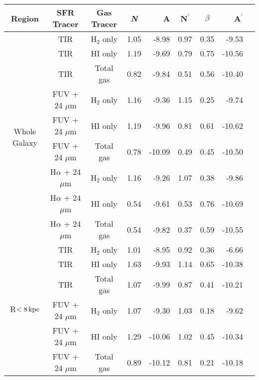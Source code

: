\documentclass[useAMS,usenatbib]{mn2e}
\newcommand \kpc        {\,{\rm kpc}}
\newcommand \nprime {N$^\prime$}
\begin{document}
\begin{table*}
\caption{Fitting parameters of the SF laws from applying the Bayesian method, {\it N} is the power index of the K-S law; A is the intercept of the K-S law; \nprime is the gas power index in the extended Schmidt law; $\beta$ is the power index of the stellar component in the extended Schmidt law; and A$^\prime$ is the intercept of the extended Schmidt law}
\label{table:res}
\begin{tabular}{ccccrccrr}
\hline\hline
\multicolumn{1}{c}{\multirow{1}{*}{Region}} & SFR Tracer        & Gas Tracer & {\it N}    & A      & \nprime & $\beta$ & A$^\prime$ \\
\hline
\multicolumn{1}{c}{\multirow{9}{*}{Whole Galaxy}} & TIR               & H$_2$ only & 1.05 & -8.98  & 0.97    & 0.35    & -9.53      \\
 & TIR               & HI only    & 1.19 & -9.69  & 0.79    & 0.75    & -10.56     \\
 & TIR               & Total gas  & 0.82 & -9.84  & 0.51    & 0.56    & -10.40     \\
 & FUV + 24 $\mu$m       & H$_2$ only & 1.16 & -9.36  & 1.15    & 0.25    & -9.74      \\
 & FUV + 24 $\mu$m       & HI only    & 1.19 & -9.96  & 0.81    & 0.61    & -10.62     \\
 & FUV + 24 $\mu$m       & Total gas  & 0.78 & -10.09 & 0.49    & 0.45    & -10.50     \\
 & H$\alpha$ + 24 $\mu$m & H$_2$ only & 1.16 & -9.26  & 1.07    & 0.38    & -9.86      \\
 & H$\alpha$ + 24 $\mu$m & HI only    & 0.54 & -9.61  & 0.53    & 0.76    & -10.69     \\
 & H$\alpha$ + 24 $\mu$m & Total gas  & 0.54 & -9.82  & 0.37    & 0.59    & -10.55     \\
\hline
\multicolumn{1}{c}{\multirow{9}{*}{R$< 8\kpc$}} & TIR               & H$_2$ only & 1.01 & -8.95  & 0.92    & 0.36    & -6.66      \\
 & TIR               & HI only    & 1.63 & -9.93  & 1.14    & 0.65    & -10.38     \\
 & TIR               & Total gas  & 1.07 & -9.99  & 0.87    & 0.41    & -10.21     \\
 & FUV + 24 $\mu$m       & H$_2$ only & 1.07 & -9.30  & 1.03    & 0.18    & -9.62      \\
 & FUV + 24 $\mu$m       & HI only    & 1.29 & -10.06 & 1.02    & 0.45    & -10.34     \\
 & FUV + 24 $\mu$m       & Total gas  & 0.89 & -10.12 & 0.81    & 0.21    & -10.18      \\

\end{tabular}
\end{table*}
\end{document}
